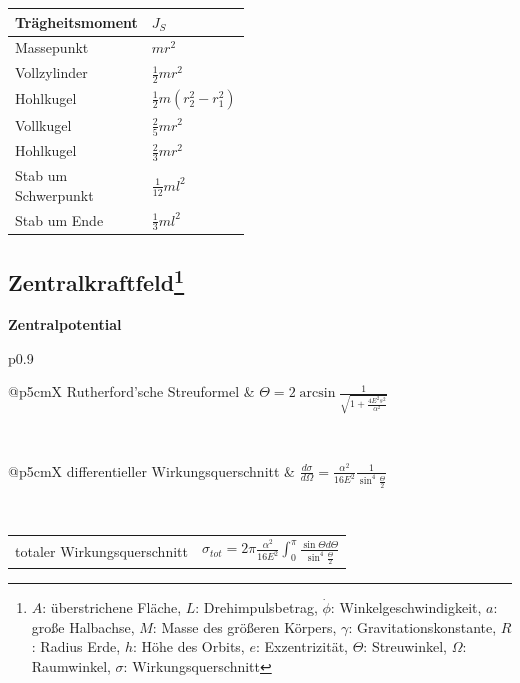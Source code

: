 \documentclass[12pt,a4paper, twoside]{article}
\makeatletter
\renewcommand{\d}[2]{\frac{d #1}{d #2}}
\renewcommand{\=}[1]{\stackrel{#1}{=}}
\theoremstyle{definition}
\theoremstyle{remark}
\newcommand{\concept}[2]{%
\noindent
\begin{framed}
\noindent\textbf{#1}
\par\begin{tabular}{p{0.9\linewidth}}
#2
\end{tabular}
\end{framed}
}
\newcommand{\f}[2]{%
\noindent\begin{tabularx}{\linewidth}{@{}p{5cm}X}
#1 & $#2$
\end{tabularx}}
\makeatother
\begin{document}
\begin{center}
\begin{framed}
\begin{tabular}{ll}
Trägheitsmoment & $J_S$\\
\midrule
Massepunkt & $mr^2$ \\
Vollzylinder & $\frac{1}{2}mr^2$ \\
Hohlkugel & $\frac{1}{2}m(r_2^2 - r_1^2)$ \\
Vollkugel & $\frac{2}{5}mr^2$ \\
Hohlkugel & $\frac{2}{3}mr^2$ \\
\makecell[l]{Stab um \\Schwerpunkt} & $\frac{1}{12}ml^2$ \\
Stab um Ende & $\frac{1}{3}ml^2$
\end{tabular}
\end{framed}
\end{center}


\subsection[Zentralkraftfeld]{Zentralkraftfeld\let\thefootnote\relax\footnote{$A$: überstrichene Fläche, $L$: Drehimpulsbetrag, $\dot \phi$: Winkelgeschwindigkeit, $a$: große Halbachse, $M$: Masse des größeren Körpers, $\gamma$: Gravitationskonstante, $R$: Radius Erde, $h$: Höhe des Orbits, $e$: Exzentrizität, $\Theta$: Streuwinkel, $\Omega$: Raumwinkel, $\sigma$: Wirkungsquerschnitt}}

\concept{Zentralpotential}{

\f{Rutherford'sche Streuformel}{\Theta = 2 \arcsin \frac{1}{\sqrt{1 + \frac{4 E^2 s ^2 }{\alpha ^2}}}}\\
\f{differentieller Wirkungsquerschnitt}{\d{\sigma}{\Omega} = \frac{\alpha ^2}{16E^2} \frac{1}{\sin^4 \frac{\Theta}{2}}}\\
\f{totaler Wirkungsquerschnitt}{\sigma_{tot} = 2\pi \frac{\alpha^2}{16E^2} \int_0^{\pi} \frac{\sin \Theta d\Theta}{\sin^4 \frac{\Theta}{2}}}
}
\end{document}
